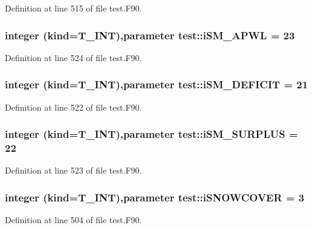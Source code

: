 Definition at line 515 of file test.F90.

\hypertarget{namespacetest_a575084634243635f2b95f243548de016}{
\subsubsection[{iSM\_\-APWL}]{\setlength{\rightskip}{0pt plus 5cm}integer (kind={\bf T\_\-INT}),parameter {\bf test::iSM\_\-APWL} = 23}}
\label{namespacetest_a575084634243635f2b95f243548de016}


Definition at line 524 of file test.F90.

\hypertarget{namespacetest_a383b6fea0fe65ad1c1832ef3f5922070}{
\subsubsection[{iSM\_\-DEFICIT}]{\setlength{\rightskip}{0pt plus 5cm}integer (kind={\bf T\_\-INT}),parameter {\bf test::iSM\_\-DEFICIT} = 21}}
\label{namespacetest_a383b6fea0fe65ad1c1832ef3f5922070}


Definition at line 522 of file test.F90.

\hypertarget{namespacetest_a9efe22e7483171c67675c69e02b3f2c4}{
\subsubsection[{iSM\_\-SURPLUS}]{\setlength{\rightskip}{0pt plus 5cm}integer (kind={\bf T\_\-INT}),parameter {\bf test::iSM\_\-SURPLUS} = 22}}
\label{namespacetest_a9efe22e7483171c67675c69e02b3f2c4}


Definition at line 523 of file test.F90.

\hypertarget{namespacetest_a0b1f3cd89bcb139c712a36ad034b58ea}{
\subsubsection[{iSNOWCOVER}]{\setlength{\rightskip}{0pt plus 5cm}integer (kind={\bf T\_\-INT}),parameter {\bf test::iSNOWCOVER} = 3}}
\label{namespacetest_a0b1f3cd89bcb139c712a36ad034b58ea}


Definition at line 504 of file test.F90.

